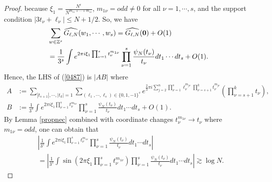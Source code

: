\documentclass[10pt,a4paper]{amsart}
\numberwithin{equation}{section}
\begin{document}
\begin{proof}
because $\xi_1=\frac{N^{\epsilon}}{N^{m_{11}+\cdots+m_{1s}}}$, $m_{1\nu}=odd\ne 0$ for all $\nu=1,\cdots,s$, and the support condition $|3t_\nu+\ell_\nu|\le N+1/2$. So, we have
\begin{align*}
	&\sum_{w\in \mathbb{Z}^s} \widehat{G_{\ell,N}}(w_1,\cdots,w_s)=\widehat{G_{\ell,N}}({\bf 0})+O(1)\\
	&=\frac{1}{3^s}\int   e^{2\pi i \xi_1 \prod_{\nu=1}^s t_\nu^{m_{1\nu}} } \prod_{\nu=1}^s \frac{\psi_{N}(t_\nu)}{t_\nu}   dt_1\cdots dt_s+O(1).
\end{align*}
Hence,
the LHS of (\ref{0487}) is $|AB|$ where
\begin{align*}
A&:=\sum_{|t_{s+1}|,\cdots,|t_k|=1}  \sum_{(\ell_1,\cdots,\ell_s)\in\{0,1,-1\}^s} e^{\frac{2}{3}\pi i 
 \sum_{j=2}^n \prod_{\nu=1}^s \ell_\nu^{m_{j\nu}} \prod_{\nu=s+1}^k t_\nu^{m_{j\nu}}  }\left(\prod_{\nu=s+1}^k t_{\nu}\right),\\
B&:= \frac{1}{3^s}\int   e^{2\pi i \xi_1 \prod_{\nu=1}^s t_\nu^{m_{1\nu}} } \prod_{\nu=1}^s \frac{\psi_{N}(t_\nu)}{t_\nu}   dt_1\cdots dt_s+O(1).
\end{align*}
By Lemma \ref{propnec} combined  with coordinate changes $t_\nu^{m_{1\nu}}\rightarrow t_\nu$ where $m_{1\nu}=odd$, one can obtain that
\begin{align*}
  &\left|  \frac{1}{3^s}\int   e^{2\pi i \xi_1 \prod_{\nu=1}^s t_\nu^{m_{1\nu}} } \prod_{\nu=1}^s \frac{\psi_{N}(t_\nu)}{t_\nu}   dt_1\cdots dt_s\right| \\
 &=\left| \frac{1}{3^s}  \int   \sin \left(2\pi  \xi_1 \prod_{\nu=1}^s t_\nu^{m_{1\nu}}\right)   \prod_{\nu=1}^s \frac{\psi_{N}(t_\nu)}{t_\nu}   dt_1\cdots dt_s\right|\gtrsim  \log N.
\end{align*}


\end{proof}
\end{document}
